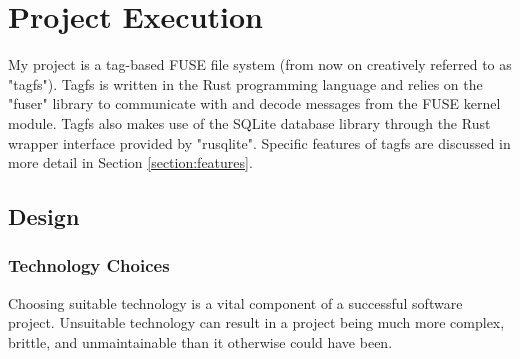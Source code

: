 \chapter{Project Execution}
\vspace{1cm}

My project is a tag-based FUSE file system (from now on creatively referred to
as "tagfs"). Tagfs is written in the Rust programming language and relies on
the "fuser" library to communicate with and decode messages from the FUSE
kernel module. Tagfs also makes use of the SQLite database library through the
Rust wrapper interface provided by "rusqlite". Specific features of tagfs are
discussed in more detail in Section \ref{section:features}. 

\section{Design}

\subsection{Technology Choices}

Choosing suitable technology is a vital component of a successful software
project. Unsuitable technology can result in a project being much more complex,
brittle, and unmaintainable than it otherwise could have been. 

